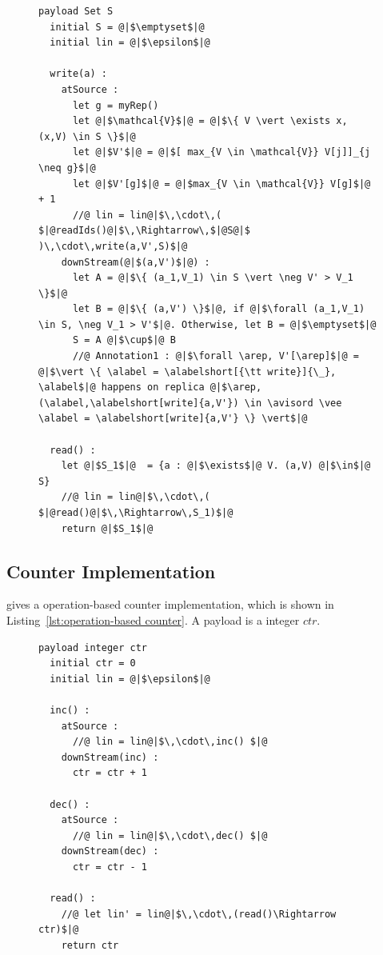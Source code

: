 \begin{figure}[t]
\begin{lstlisting}[frame=top,caption={Pseudo-code of operation-based multi-value register},
captionpos=b,label={lst:operation-based multi-value register}]
  payload Set S
  initial S = @|$\emptyset$|@
  initial lin = @|$\epsilon$|@

  write(a) :
    atSource :
      let g = myRep()
      let @|$\mathcal{V}$|@ = @|$\{ V \vert \exists x, (x,V) \in S \}$|@
      let @|$V'$|@ = @|$[ max_{V \in \mathcal{V}} V[j]]_{j \neq g}$|@
      let @|$V'[g]$|@ = @|$max_{V \in \mathcal{V}} V[g]$|@ + 1
      //@ lin = lin@|$\,\cdot\,( $|@readIds()@|$\,\Rightarrow\,$|@S@|$ )\,\cdot\,write(a,V',S)$|@
    downStream(@|$(a,V')$|@) :
      let A = @|$\{ (a_1,V_1) \in S \vert \neg V' > V_1 \}$|@
      let B = @|$\{ (a,V') \}$|@, if @|$\forall (a_1,V_1) \in S, \neg V_1 > V'$|@. Otherwise, let B = @|$\emptyset$|@
      S = A @|$\cup$|@ B
      //@ Annotation1 : @|$\forall \arep, V'[\arep]$|@ = @|$\vert \{ \alabel = \alabelshort[{\tt write}]{\_}, \alabel$|@ happens on replica @|$\arep,  (\alabel,\alabelshort[write]{a,V'}) \in \avisord \vee \alabel = \alabelshort[write]{a,V'} \} \vert$|@

  read() :
    let @|$S_1$|@  = {a : @|$\exists$|@ V. (a,V) @|$\in$|@ S}
    //@ lin = lin@|$\,\cdot\,( $|@read()@|$\,\Rightarrow\,S_1)$|@
    return @|$S_1$|@
\end{lstlisting}
\end{figure}







\subsection{Counter Implementation}
\label{subsec:counter implementation}

\cite{ShapiroPBZ11} gives a operation-based counter implementation, which is shown in Listing~\ref{lst:operation-based counter}. A payload is a integer $ctr$.


\begin{figure}[t]
\begin{lstlisting}[frame=top,caption={Pseudo-code of operation-based counter},
captionpos=b,label={lst:operation-based counter}]
  payload integer ctr
  initial ctr = 0
  initial lin = @|$\epsilon$|@

  inc() :
    atSource :
      //@ lin = lin@|$\,\cdot\,inc() $|@
    downStream(inc) :
      ctr = ctr + 1

  dec() :
    atSource :
      //@ lin = lin@|$\,\cdot\,dec() $|@
    downStream(dec) :
      ctr = ctr - 1

  read() :
    //@ let lin' = lin@|$\,\cdot\,(read()\Rightarrow ctr)$|@
    return ctr
\end{lstlisting}
\end{figure}

